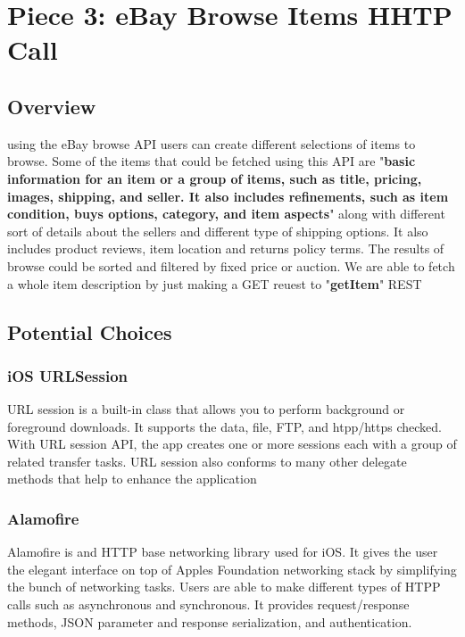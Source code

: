 \documentclass[onecolumn, draftclsnofoot,10pt, compsoc]{IEEEtran}
\begin{document}
\section{Piece 3: eBay Browse Items HHTP Call}
\subsection{Overview}
using the eBay browse API users can create different selections of items to browse. Some of the items that could be fetched using this API are "\textbf{basic information for an item or a group of items, such as title, pricing, images, shipping, and seller. It also includes refinements, such as item condition, buys options, category, and item aspects}" along with different sort of details about the sellers and different type of shipping options. It also includes product reviews, item location and returns policy terms. The results of browse could be sorted and filtered by fixed price or auction. We are able to fetch a whole item description by just making a GET reuest to "\textbf{getItem}" REST

\subsection{Potential Choices}
\subsubsection{iOS URLSession \cite{URLSession}}
\par URL session is a built-in class that allows you to perform background or foreground downloads. It supports the data, file, FTP, and htpp/https checked. With URL session API, the app creates one or more sessions each with a group of related transfer tasks. URL session also conforms to many other delegate methods that help to enhance the application

\subsubsection{Alamofire\cite{Alamofire}}
\par Alamofire is and HTTP base networking library used for iOS. It gives the user the elegant interface on top of Apples Foundation networking stack by simplifying the bunch of networking tasks. Users are able to make different types of HTPP calls such as asynchronous and synchronous. It provides request/response methods, JSON parameter and response serialization, and authentication.
\end{document}
